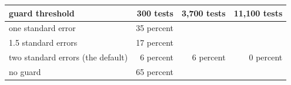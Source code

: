 \begin{tabular}{lrrr}
\toprule
guard threshold & 300 tests & 3,700 tests & 11,100 tests \\
\midrule
one standard error & 35 percent &  &  \\
1.5 standard errors & 17 percent &  &  \\
two standard errors (the default) & 6 percent & 6 percent & 0 percent \\
no guard & 65 percent &  &  \\
\bottomrule
\end{tabular}
